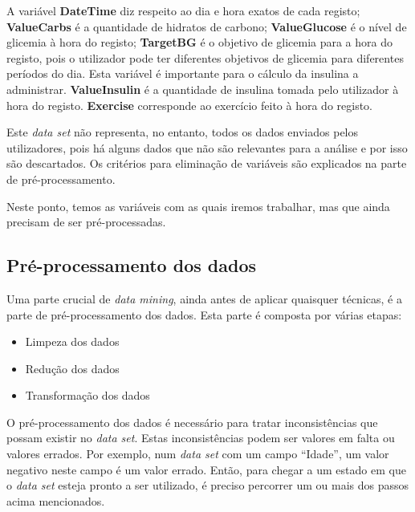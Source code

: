 A variável \textbf{DateTime} diz respeito ao dia e hora exatos de cada registo;
\textbf{Value\textunderscore Carbs} é a quantidade de hidratos de carbono;
\textbf{Value\textunderscore Glucose} é o nível de glicemia à hora do registo;
\textbf{Target\textunderscore BG} é o objetivo de glicemia para a hora do registo, pois o utilizador pode ter diferentes objetivos de glicemia para diferentes períodos do dia. Esta variável é importante para o cálculo da insulina a administrar.
\textbf{Value\textunderscore Insulin} é a quantidade de insulina tomada pelo utilizador à hora do registo.
\textbf{Exercise} corresponde ao exercício feito à hora do registo.\newline

Este \textit{data set} não representa, no entanto, todos os dados enviados pelos utilizadores, pois há alguns dados que não são relevantes para a análise e por isso são descartados. Os critérios para eliminação de variáveis são explicados na parte de pré-processamento.

Neste ponto, temos as variáveis com as quais iremos trabalhar, mas que ainda precisam de ser pré-processadas.

\subsection{Pré-processamento dos dados}

Uma parte crucial de \textit{data mining}, ainda antes de aplicar quaisquer técnicas, é a parte de pré-processamento dos dados. Esta parte é composta por várias etapas:

\begin{itemize}
\item Limpeza dos dados
\item Redução dos dados
\item Transformação dos dados
\end{itemize}
 
O pré-processamento dos dados é necessário para tratar inconsistências que possam existir no \textit{data set}. Estas inconsistências podem ser valores em falta ou valores errados. Por exemplo, num \textit{data set} com um campo ``Idade'', um valor negativo neste campo é um valor errado. Então, para chegar a um estado em que o \textit{data set} esteja pronto a ser utilizado, é preciso percorrer um ou mais dos passos acima mencionados. 


